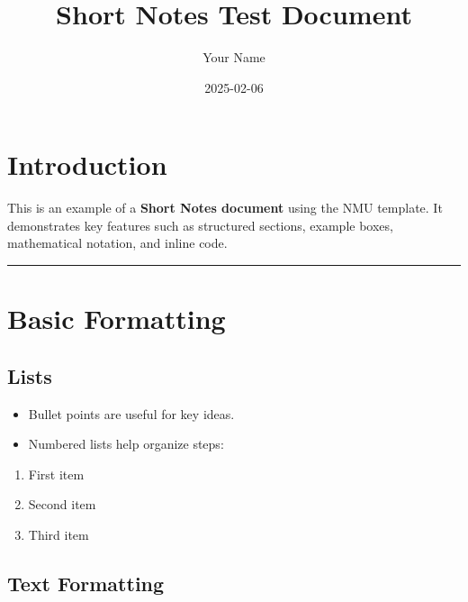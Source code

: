 \documentclass[
  14pt,
  a4paper,
]{extarticle}
\title{Short Notes Test Document}
\author{Your Name}
\date{2025-02-06}
\providecommand{\tightlist}{%
  \setlength{\itemsep}{0pt}\setlength{\parskip}{0pt}}
\begin{document}
\maketitle

\section{\texorpdfstring{
\textbf{Introduction}}{ Introduction}}\label{introduction}

This is an example of a \textbf{Short Notes document} using the NMU
template. It demonstrates key features such as structured sections,
example boxes, mathematical notation, and inline code.

\begin{center}\rule{0.5\linewidth}{0.5pt}\end{center}

\section{\texorpdfstring{ \textbf{Basic
Formatting}}{ Basic Formatting}}\label{basic-formatting}

\subsection{\texorpdfstring{
\textbf{Lists}}{ Lists}}\label{lists}

\begin{itemize}
\tightlist
\item
  Bullet points are useful for key ideas.\\
\item
  Numbered lists help organize steps:
\end{itemize}

\begin{enumerate}
\def\labelenumi{\arabic{enumi}.}
\tightlist
\item
  First item\\
\item
  Second item\\
\item
  Third item
\end{enumerate}

\subsection{\texorpdfstring{ \textbf{Text
Formatting}}{ Text Formatting}}\label{text-formatting}
\end{document}

